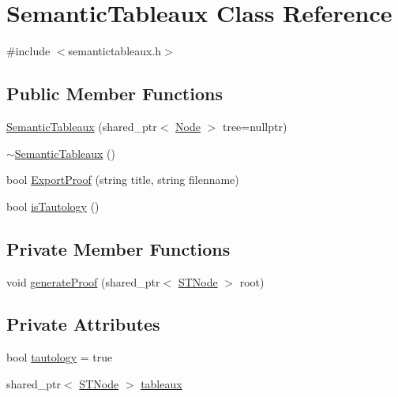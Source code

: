 \hypertarget{class_semantic_tableaux}{}\section{Semantic\+Tableaux Class Reference}
\label{class_semantic_tableaux}


{\ttfamily \#include $<$semantictableaux.\+h$>$}

\subsection*{Public Member Functions}
\begin{DoxyCompactItemize}
\item 
\hyperlink{class_semantic_tableaux_a10b854a82ce27c588d45d82895aa7a45}{Semantic\+Tableaux} (shared\+\_\+ptr$<$ \hyperlink{class_node}{Node} $>$ tree=nullptr)
\item 
\hyperlink{class_semantic_tableaux_a6c03c9108f2552c3756a5bdd6b6116f1}{$\sim$\+Semantic\+Tableaux} ()
\item 
bool \hyperlink{class_semantic_tableaux_a78039805239590cd2c8bc411158f2b2d}{Export\+Proof} (string title, string filenname)
\item 
bool \hyperlink{class_semantic_tableaux_a18a9f8fc5dce074c040564454fd710c3}{is\+Tautology} ()
\end{DoxyCompactItemize}
\subsection*{Private Member Functions}
\begin{DoxyCompactItemize}
\item 
void \hyperlink{class_semantic_tableaux_ab41b0fa5d87d29ad807b410f18ce93a7}{generate\+Proof} (shared\+\_\+ptr$<$ \hyperlink{class_s_t_node}{S\+T\+Node} $>$ root)
\end{DoxyCompactItemize}
\subsection*{Private Attributes}
\begin{DoxyCompactItemize}
\item 
bool \hyperlink{class_semantic_tableaux_a9fd70e5435a0fed98339fd3dad868e71}{tautology} = true
\item 
shared\+\_\+ptr$<$ \hyperlink{class_s_t_node}{S\+T\+Node} $>$ \hyperlink{class_semantic_tableaux_aff7d804483776b8517694f308a3071df}{tableaux}
\end{DoxyCompactItemize}


